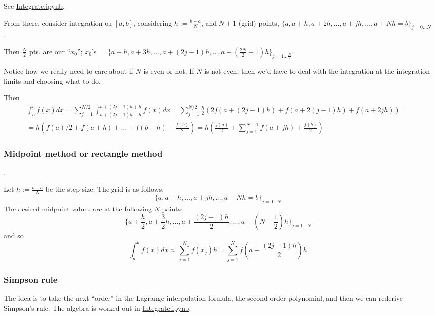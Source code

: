 \documentclass[10pt]{amsart}
\begin{document}
\begin{multicols*}{2}
See \href{https://github.com/ernestyalumni/CompPhys/blob/master/Cpp/Integrate.ipynb}{Integrate.ipynb}.

From there, consider integration on $[a,b]$, considering $h := \frac{b-a}{N}$, and $N+1$ (grid) points, $\lbrace a, a+h, a+2h, \dots , a+ jh, \dots , a+Nh = b\rbrace_{j=0 \dots N }$.

Then $\frac{N}{2}$ pts. are our ``$x_0$''; $x_0$'s $= \lbrace a +h , a+3h, \dots , a+(2j-1)h, \dots , a+ \left( \frac{2 N}{2} - 1 \right)h \rbrace_{j=1 \dots \frac{N}{2} }$.

Notice how we really need to care about if $N$ is even or not.  If $N$ is not even, then we'd have to deal with the integration at the integration limits and choosing what to do.  

Then
\[
\begin{gathered}
  \int_a^b f(x) dx = \sum_{j=1}^{N/2} \int_{a + (2j-1)h-h}^{a+(2j-1)h+h} f(x)dx = \sum_{j=1}^{N/2} \frac{h}{2} ( 2f(a+(2j-1)h ) + f(a+2(j-1)h) + f(a+2jh) ) = \\
   = h(f(a)/2 + f(a+h) + \dots + f(b-h) + \frac{f(b)}{2} ) = h \left( \frac{f(a)}{2} + \sum_{j=1}^{N-1} f(a+jh) + \frac{f(b)}{2} \right)
  \end{gathered}
\]

\subsubsection{Midpoint method or rectangle method}.

Let $h := \frac{b-a}{N}$ be the step size.  The grid is as follows:
\[
\lbrace a , a +h , \dots , a + jh , \dots , a+Nh = b\rbrace_{j=0\dots N}
\]
The desired midpoint values are at the following $N$ points:
\[
\lbrace a + \frac{h}{2} , a + \frac{3}{2} h , \dots , a+\frac{(2j-1 ) h }{2} , \dots , a + \left( N - \frac{1}{2} \right) h \rbrace_{j=1 \dots N}
\]
and so
\begin{equation}
  \int_a^b f(x) dx \approx \sum_{j=1}^N f(x_j) h = \sum_{j=1}^N f\left( a + \frac{(2j-1) h}{2} \right)h 
\end{equation}


\subsubsection{Simpson rule}

The idea is to take the next ``order'' in the Lagrange interpolation formula, the second-order polynomial, and then we can rederive Simpson's rule.  The algebra is worked out in \href{https://github.com/ernestyalumni/CompPhys/blob/master/Cpp/Integrate.ipynb}{Integrate.ipynb}.


\end{multicols*}
\end{document}
